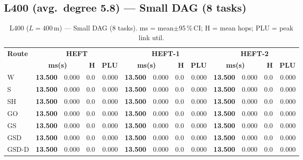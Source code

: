 \documentclass[11pt]{article}
\newcommand{\win}[1]{\textcolor{green!50!black}{\textbf{#1}}}
\begin{document}
\subsection{L400 (avg.\ degree 5.8) --- Small DAG (8 tasks)}
\begin{table}[H]\centering\small
\begin{tabular}{l r@{$\pm$}l r r r@{$\pm$}l r r r@{$\pm$}l r r}
\toprule
\textbf{Route} & \multicolumn{4}{c}{\textbf{HEFT}} & \multicolumn{4}{c}{\textbf{HEFT-1}} & \multicolumn{4}{c}{\textbf{HEFT-2}} \\
\cmidrule(lr){2-5}\cmidrule(lr){6-9}\cmidrule(lr){10-13}
& \multicolumn{2}{c}{\textbf{ms(s)}} & \textbf{H} & \textbf{PLU}& \multicolumn{2}{c}{\textbf{ms(s)}} & \textbf{H} & \textbf{PLU}& \multicolumn{2}{c}{\textbf{ms(s)}} & \textbf{H} & \textbf{PLU} \\
\midrule
  W & \win{13.500} & 0.000 & 0.0 & 0.000 & \win{13.500} & 0.000 & 0.0 & 0.000 & \win{13.500} & 0.000 & 0.0 & 0.000 \\
  S & \win{13.500} & 0.000 & 0.0 & 0.000 & \win{13.500} & 0.000 & 0.0 & 0.000 & \win{13.500} & 0.000 & 0.0 & 0.000 \\
  SH & \win{13.500} & 0.000 & 0.0 & 0.000 & \win{13.500} & 0.000 & 0.0 & 0.000 & \win{13.500} & 0.000 & 0.0 & 0.000 \\
  GO & \win{13.500} & 0.000 & 0.0 & 0.000 & \win{13.500} & 0.000 & 0.0 & 0.000 & \win{13.500} & 0.000 & 0.0 & 0.000 \\
  GS & \win{13.500} & 0.000 & 0.0 & 0.000 & \win{13.500} & 0.000 & 0.0 & 0.000 & \win{13.500} & 0.000 & 0.0 & 0.000 \\
  GSD & \win{13.500} & 0.000 & 0.0 & 0.000 & \win{13.500} & 0.000 & 0.0 & 0.000 & \win{13.500} & 0.000 & 0.0 & 0.000 \\
  GSD-D & \win{13.500} & 0.000 & 0.0 & 0.000 & \win{13.500} & 0.000 & 0.0 & 0.000 & \win{13.500} & 0.000 & 0.0 & 0.000 \\
\bottomrule\end{tabular}
\caption{L400 ($L=400$\,m) --- Small DAG (8 tasks). ms = mean$\pm$95\,\%\,CI; H = mean hops; PLU = peak link util.}
\end{table}
\end{document}

